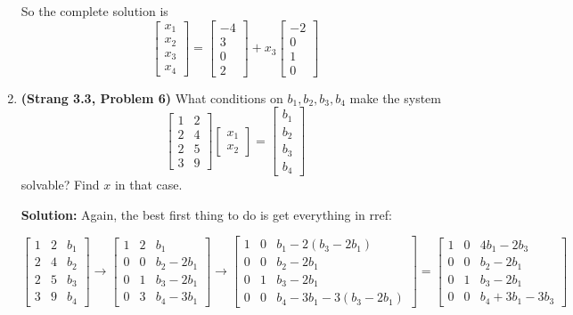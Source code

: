 \documentclass[11pt]{article}
\begin{document}
\begin{enumerate}
So the complete solution is
\[ \begin{bmatrix} x_1 \\ x_2 \\x_3 \\x_4 \end{bmatrix} = \begin{bmatrix} -4 \\ 3 \\ 0 \\ 2 \end{bmatrix} + x_3  \begin{bmatrix} -2 \\ 0 \\ 1 \\ 0 \end{bmatrix}\]

\item \textbf{(Strang 3.3, Problem 6)} What conditions on $b_1, b_2, b_3, b_4$ make the system
\[ \begin{bmatrix} 1 & 2 \\ 2 & 4 \\ 2 & 5 \\3 & 9 \end{bmatrix} \begin{bmatrix} x_1 \\ x_2 \end{bmatrix} = \begin{bmatrix} b_1 \\ b_2 \\ b_3 \\ b_4 \end{bmatrix} \]
solvable?  Find $x$ in that case.

\textbf{Solution:} Again, the best first thing to do is get everything in rref:

\[ \begin{bmatrix} 1 & 2 & b_1 \\ 2 & 4 &b_2 \\ 2 & 5 & b_3 \\3 & 9 & b_4 \end{bmatrix} \to \begin{bmatrix} 1 & 2 & b_1 \\ 0 & 0 &b_2 - 2b_1 \\ 0 & 1 & b_3-2b_1 \\0 & 3 & b_4 - 3b_1 \end{bmatrix} \to \begin{bmatrix} 1 & 0 & b_1 - 2(b_3 - 2b_1) \\ 0 & 0 &b_2 - 2b_1 \\ 0 & 1 & b_3-2b_1 \\0 & 0 & b_4 - 3b_1 - 3(b_3-2b_1) \end{bmatrix} = \begin{bmatrix} 1 & 0 & 4b_1 - 2b_3 \\ 0 & 0 &b_2 - 2b_1 \\ 0 & 1 & b_3-2b_1 \\0 & 0 & b_4 + 3b_1 - 3b_3 \end{bmatrix} \]


\end{enumerate}
\end{document}
